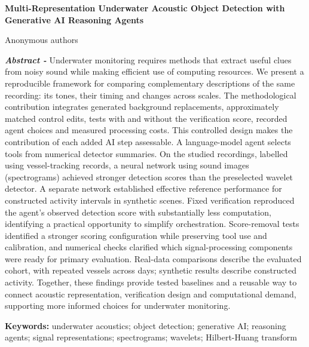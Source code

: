\documentclass[11pt,letterpaper]{article}
\newcommand{\drafttitle}[1]{\begin{center}\sffamily\bfseries\fontsize{16}{19}\selectfont #1\end{center}}
\begin{document}
\fontsize{11}{13}\selectfont

\nocite{portia,signals1,signals2,uabench,physicsgen,huang1998,flowmatching,qwen,waveletship,uniqueship,speechocean,wav2vec2}

\drafttitle{Multi-Representation Underwater Acoustic Object Detection with Generative AI Reasoning Agents}

\begin{center}Anonymous authors\end{center}

{\fontsize{10}{11.5}\selectfont\noindent \textbf{\textit{Abstract - }}Underwater monitoring requires methods that extract useful clues from noisy sound while making efficient use of computing resources. We present a reproducible framework for comparing complementary descriptions of the same recording: its tones, their timing and changes across scales. The methodological contribution integrates generated background replacements, approximately matched control edits, tests with and without the verification score, recorded agent choices and measured processing costs. This controlled design makes the contribution of each added AI step assessable. A language-model agent selects tools from numerical detector summaries. On the studied recordings, labelled using vessel-tracking records, a neural network using sound images (spectrograms) achieved stronger detection scores than the preselected wavelet detector. A separate network established effective reference performance for constructed activity intervals in synthetic scenes. Fixed verification reproduced the agent's observed detection score with substantially less computation, identifying a practical opportunity to simplify orchestration. Score-removal tests identified a stronger scoring configuration while preserving tool use and calibration, and numerical checks clarified which signal-processing components were ready for primary evaluation. Real-data comparisons describe the evaluated cohort, with repeated vessels across days; synthetic results describe constructed activity. Together, these findings provide tested baselines and a reusable way to connect acoustic representation, verification design and computational demand, supporting more informed choices for underwater monitoring.\par}

{\fontsize{9}{11}\selectfont\noindent \textbf{Keywords:} underwater acoustics; object detection; generative AI; reasoning agents; signal representations; spectrograms; wavelets; Hilbert-Huang transform\par}
\end{document}

